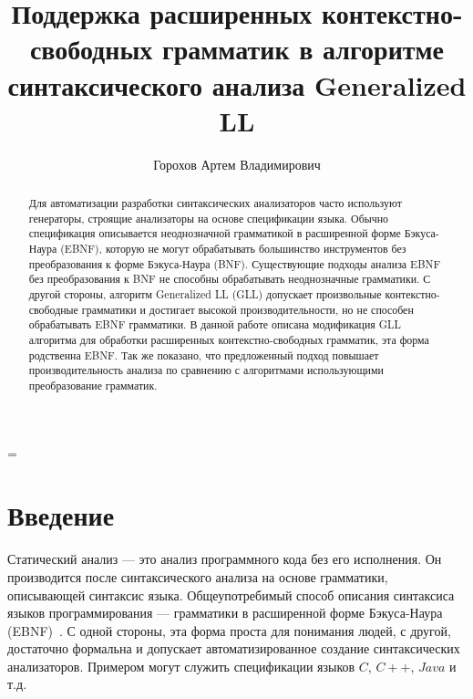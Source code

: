 \newtheorem{mydef}{Определение}
\emergencystretch=\maxdimen



\title{Поддержка расширенных контекстно-свободных грамматик 
	в алгоритме синтаксического анализа Generalized LL}


\author{Горохов Артем Владимирович}



\maketitle

\begin{abstract}
	Для автоматизации разработки синтаксических анализаторов часто используют генераторы, строящие анализаторы на основе спецификации языка.
	Обычно спецификация описывается неоднозначной грамматикой в расширенной форме Бэкуса-Наура (EBNF), которую не могут обрабатывать большинство инструментов без преобразования
	к форме Бэкуса-Наура (BNF).	Существующие подходы анализа EBNF без преобразования к BNF не способны обрабатывать неоднозначные грамматики. С другой стороны, алгоритм Generalized LL (GLL) допускает произвольные контекстно-свободные грамматики и достигает	высокой производительности, но не способен обрабатывать EBNF грамматики. 
	В данной работе описана модификация GLL алгоритма для обработки расширенных контекстно-свободных грамматик,
	эта форма родственна EBNF. Так же показано, что предложенный подход повышает производительность анализа по сравнению с алгоритмами использующими преобразование грамматик.
\end{abstract}


\section*{Введение}

Статический анализ --- это анализ программного кода без его исполнения. Он производится после синтаксического анализа на основе грамматики,
описывающей синтаксис языка.
Общеупотребимый способ описания синтаксиса языков программирования --- грамматики в расширенной форме Бэкуса-Наура (EBNF)~\cite{EBNFISO}.
С одной стороны, эта форма проста для понимания людей, с другой, достаточно формальна и допускает автоматизированное создание синтаксических анализаторов.
Примером могут служить спецификации языков $C$, $C++$, $Java$ и т.д. 

